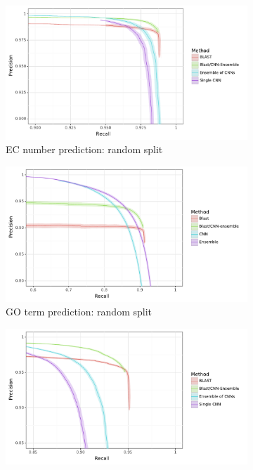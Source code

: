 \begin{figure}[ht] 
  \begin{subfigure}[b]{0.5\linewidth}
    \centering
    \includegraphics[width=1\linewidth]{Figures/random_truncated.pdf}
    \caption{EC number prediction: random split} 
    \label{fig:with_ensemble:a} 
    \vspace{4ex}
  \end{subfigure}%
  \begin{subfigure}[b]{0.5\linewidth}
    \centering
    \includegraphics[width=1\linewidth]{Figures/random_truncated_go.pdf}
    \caption{GO term prediction: random split} 
    \label{fig:with_ensemble:b} 
    \vspace{4ex}
  \end{subfigure} 
  \begin{subfigure}[b]{0.5\linewidth}
    \centering
    \includegraphics[width=1\linewidth]{Figures/clustered_truncated.pdf}

\end{subfigure}
\end{figure}
